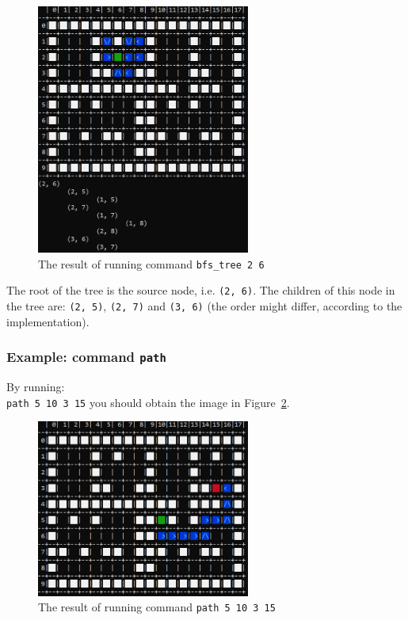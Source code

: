 \documentclass[../en-fa-lab.tex]{subfiles}
\begin{document}
\begin{figure}[h]
    \centering
    \includegraphics[width=7cm]{../Resources/lab9/grid_bfs_tree.png}
    \caption{The result of running command \texttt{bfs\_tree 2 6}}
    \label{fig:bfs_tree}
\end{figure}

The root of the tree is the source node, i.e. \texttt{(2, 6)}. The children of this node in the tree are: \texttt{(2, 5)}, \texttt{(2, 7)} and \texttt{(3, 6)} (the order might differ, according to the implementation).


\subsubsection{Example: command \texttt{path}}
By running:\\
\texttt{path 5 10 3 15}
you should obtain the image in Figure~\ref{fig:path}.

\begin{figure}[h]
    \centering
    \includegraphics[width=7cm]{../Resources/lab9/grid_path.png}
    \caption{The result of running command \texttt{path 5 10 3 15}}
    \label{fig:path}
\end{figure}
\end{document}
